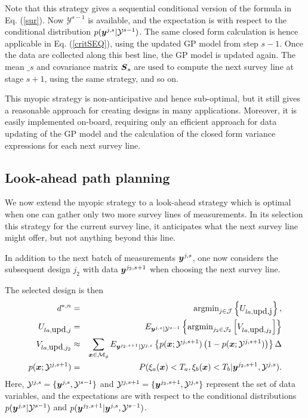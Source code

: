 \documentclass[aoas]{imsart}
\begin{document}
Note that this strategy gives a sequential conditional version of the formula in Eq. (\ref{sur}). Now $\mathcal{Y}^{s-1}$ is available, and the expectation is with respect to the conditional distribution $p({\boldsymbol y}^{j,s}|\mathcal{Y}^{s-1})$. The same closed form calculation is hence applicable in Eq. (\ref{critSEQ}), using the updated GP model from step $s-1$. 
Once the data are collected along this best line, the GP model is updated again. The mean $\bm_{s}$ and covariance matrix ${\boldsymbol S}_{s}$ are used to compute the next survey line at stage $s+1$, using the same strategy, and so on. 

This myopic strategy is non-anticipative and hence sub-optimal, but it still gives a reasonable approach for creating designs in many applications. Moreover, it is easily implemented on-board, requiring only an efficient approach for data updating of the GP model and the calculation of the closed form variance expressions for each next survey line. 


\subsection{Look-ahead path planning}
\label{LA}

We now extend the myopic strategy to a look-ahead strategy which is optimal when one can gather only two more survey lines of measurements. In its selection this strategy for the current survey line, it anticipates what the next survey line might offer, but not anything beyond this line. 

In addition to the next batch of measurements ${\boldsymbol y}^{j,s}$, one now considers the subsequent design $j_2$ with data ${\boldsymbol y}^{j_2,s+1}$ when choosing the next survey line. 

The selected design is then
\begin{eqnarray}\label{critLA}
    d^{*,n} &=& \mbox{argmin}_{j \in \mathcal{J}} \left\{ U_{la,\mbox{upd,j}} \right\},  \\
    U_{la,\mbox{upd},j} & = &  E_{\by^{j,s}|\mathcal{Y}^{s-1}} \left\{ \mbox{argmin}_{j_2 \in \mathcal{J}_2} \left[ V_{la,\mbox{upd},j_2} \right] \right\} \nonumber \\
V_{la,\mbox{upd},j_2} & \approx & \sum_{\bx \in \mathcal{M}_g} E_{\by^{j_2,s+1}|\mathcal{Y}^{j,s}} \left\{ p(\bx;\mathcal{Y}^{j,s+1})\left( 1-p(\bx;\mathcal{Y}^{j,s+1})\right) \right\} \Delta \nonumber \\
    p(\bx;\mathcal{Y}^{j,s+1}) &=& P(\xi_a(\bx) < T_a, \xi_b(\bx) < T_b |\by^{j_2,s+1},\mathcal{Y}^{j,s}). \nonumber
\end{eqnarray}
Here, $\mathcal{Y}^{j,s}=\{{\boldsymbol y}^{j,s},\mathcal{Y}^{s-1}\}$ and $\mathcal{Y}^{j,s+1}=\{{\boldsymbol y}^{j_2,s+1},\mathcal{Y}^{j,s}\}$ represent the set of data variables, and the expectations are with respect to the conditional distributions $p({\boldsymbol y}^{j,s}|\mathcal{Y}^{s-1})$ and $p({\boldsymbol y}^{j_2,s+1}|{\boldsymbol y}^{j,s},\mathcal{Y}^{s-1})$. 
\end{document}
